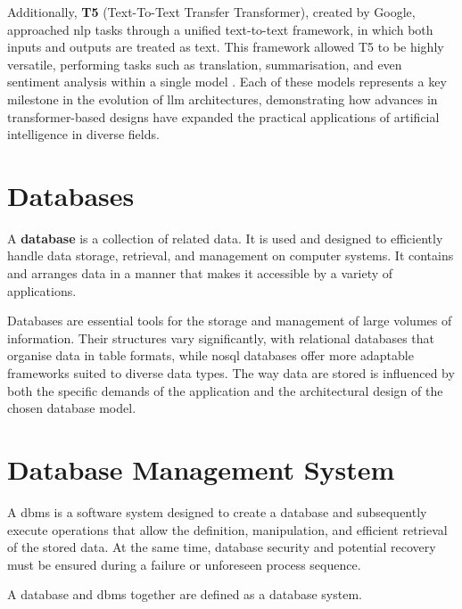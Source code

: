 Additionally, \textbf{T5} (Text-To-Text Transfer Transformer), created by Google, approached \ac{nlp} tasks through a unified text-to-text framework, in which both inputs and outputs are treated as text. This framework allowed T5 to be highly versatile, performing tasks such as translation, summarisation, and even sentiment analysis within a single model \citep{raffel2020t5}. Each of these models represents a key milestone in the evolution of \ac{llm} architectures, demonstrating how advances in transformer-based designs have expanded the practical applications of artificial intelligence in diverse fields.

\section{Databases}\label{sec:databases}
\begin{definition}\label{def:database}
    A \textbf{database} is a collection of related data\citep{limited2010introduction}. 
    It is used and designed to efficiently handle data storage, retrieval, and management on computer systems. 
    It contains and arranges data in a manner that makes it accessible by a variety of applications.
\end{definition}
Databases are essential tools for the storage and management of large volumes of information. 
Their structures vary significantly, with relational databases that organise data in table formats, while \ac{nosql} databases offer more adaptable frameworks suited to diverse data types. 
The way data are stored is influenced by both the specific demands of the application and the architectural design of the chosen database model.
\section{Database Management System}\label{sec:Database Management System}
\begin{definition}\label{def:Database Management System}
    A \ac{dbms}  is a software system designed to create a database and subsequently execute operations that allow the definition, manipulation, and efficient retrieval of the stored data. 
    At the same time, database security and potential recovery must be ensured during a failure or unforeseen process sequence. \citep{limited2010introduction}
\end{definition}
A database and \ac{dbms} together are defined as a database system.  


